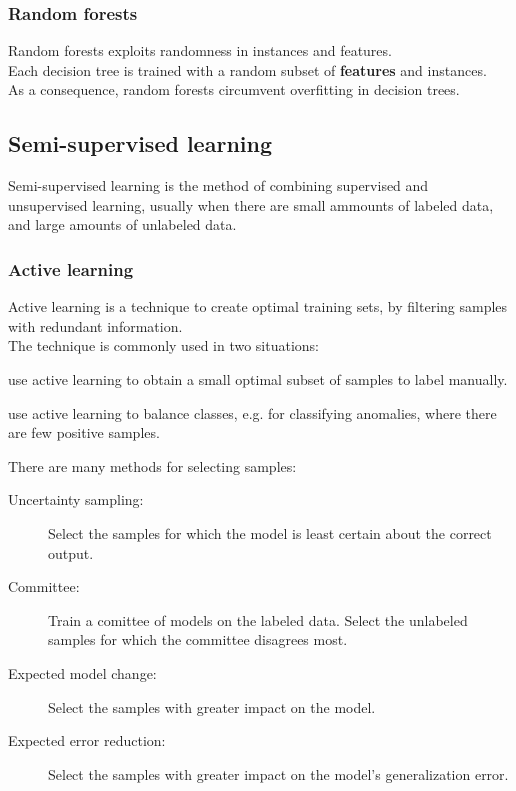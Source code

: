\documentclass[11pt]{article}
\begin{document}
\subsubsection{Random forests}
\label{sec:org9ac0198}
Random forests exploits randomness in instances and features. \\
Each decision tree is trained with a random subset of \textbf{features} and instances. \\
As a consequence, random forests circumvent overfitting in decision trees.
\subsection{Semi-supervised learning}
\label{sec:orge1da4cf}
Semi-supervised learning is the method of combining supervised and unsupervised
learning, usually when there are small ammounts of labeled data, and large amounts of
unlabeled data.
\subsubsection{Active learning}
\label{sec:orgde50ea5}
Active learning is a technique to create optimal training sets, by filtering samples
with redundant information. \\

The technique is commonly used in two situations:
\begin{description}[itemsep=0pt]
\item[{Semi-supervised:}] use active learning to obtain a small optimal subset of samples
to label manually.
\item[{Supervised:}] use active learning to balance classes, e.g. for classifying
anomalies, where there are few positive samples.
\end{description}
\vspace{5px}  There are many methods for selecting samples:
\begin{description}
\item[{Uncertainty sampling:}] Select the samples for which the model is least certain
about the correct output.
\item[{Committee:}] Train a comittee of models on the labeled data. Select the unlabeled
samples for which the committee disagrees most.
\item[{Expected model change:}] Select the samples with greater impact on the model.
\item[{Expected error reduction:}] Select the samples with greater impact on the model's
generalization error.
\end{description}
\end{document}
